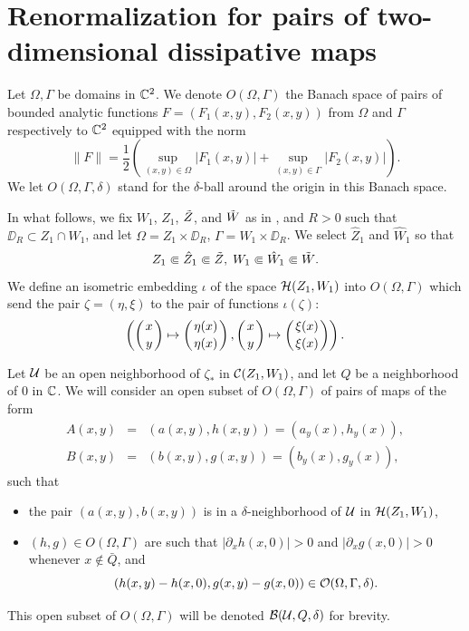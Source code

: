 
\section{Renormalization for  pairs of two-dimensional dissipative maps}\label{sec:RenACM}
Let $\Omega, \Gamma$ be  domains in ${\Bbb C}^2$. We denote $O(\Omega,\Gamma)$ the Banach space of pairs of bounded analytic functions 
$F=(F_1(x,y),F_2(x,y))$  from $\Omega$ and $\Gamma$ respectively to ${\Bbb C}^2$ equipped with the norm
\begin{equation}
\label{eq:unormm}\| F\|= \frac{1}{2} \left(   \sup_{(x,y) \in \Omega}|F_1(x,y)|+  \sup_{(x,y)\in \Gamma} |F_2(x,y) | \right).
\end{equation}
We let $O(\Omega,\Gamma,\delta)$ stand for the $\delta$-ball around the origin in this Banach space. 


In what follows, we fix $W_1$, $Z_1$, $\tilde Z$, and $\tilde W$ as in , and $R>0$ such that $\DD_R\subset Z_1\cap W_1$, and let 
$\Omega=Z_1 \times \DD_R$, $\Gamma=W_1 \times \DD_R$.
We select $\hat Z_1$ and $\hat W_1$ so that
$$Z_1 \Subset \hat Z_1\Subset \tilde Z,\; W_1\Subset \hat W_1\Subset \tilde W.$$
We define an isometric embedding $\iota$ of the space $\mathcal{H}(Z_1,W_1)$ into $O(\Omega,\Gamma)$ which send the pair $\zeta=(\eta,\xi)$ to
the  pair of functions $\iota(\zeta)$:
\begin{equation}
\label{eq:embed}
\left(\left(x \atop  y\right)\mapsto \left(\eta(x) \atop \eta(x) \right), 
\left(x \atop  y\right)\mapsto \left(\xi(x) \atop \xi(x) \right)   \right).
\end{equation}



Let $\mathcal{U}$ be an open neighborhood of $\zeta_*$ in $\mathcal{C}(Z_1,W_1)$, and let $Q$ be a neighborhood of $0$ in ${\Bbb C}$.
We will consider an open subset of  $O(\Omega,\Gamma)$ of pairs of maps of the form
\begin{eqnarray}
\label{eq:A} A(x,y)&=&(a(x,y),h(x,y))=(a_y(x),h_y(x)),\\
\label{eq:B} B(x,y)&=&(b(x,y),g(x,y))=(b_y(x),g_y(x)), 
\end{eqnarray}
such that
\begin{itemize}
\item[1)] the pair $(a(x,y),b(x,y))$ is in a $\delta$-neighborhood  of  $\mathcal{U}$ in $\mathcal{H}(Z_1,W_1)$,
\item[2)]  $(h,g) \in O(\Omega,\Gamma)$ are such that  $|\partial_x h(x,0)|>0$ and  $|\partial_x g(x,0)|>0$ whenever $x \notin \bar Q$,  and 
$$(h(x,y)-h(x,0),g(x,y)-g(x,0)) \in \mathcal{O}(\Omega,\Gamma,\delta).$$ 
\end{itemize}
This open subset of $O(\Omega,\Gamma)$ will be denoted $\mathcal{B}(\mathcal{U},Q,\delta)$ for brevity.

